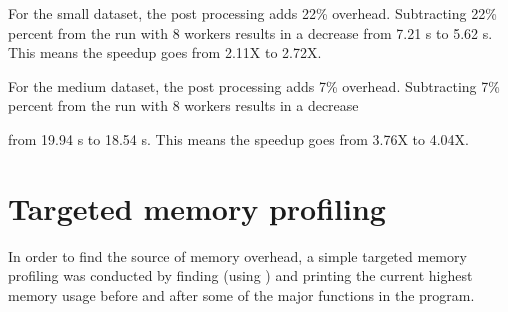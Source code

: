 For the small dataset, the post processing adds 22\% overhead. Subtracting 22\% percent from the run with 8 workers results in a decrease
from 7.21 s to 5.62 s. This means the speedup goes from 2.11X to 2.72X.

For the medium dataset, the post processing adds 7\% overhead. Subtracting 7\% percent from the run with 8 workers results in a decrease

from 19.94 s to 18.54 s. This means the speedup goes from 3.76X to 4.04X.

\section{Targeted memory profiling}
In order to find the source of memory overhead, a simple targeted memory profiling was conducted by finding (using ) and
printing the current highest memory usage before and after some of the major functions in the program.
